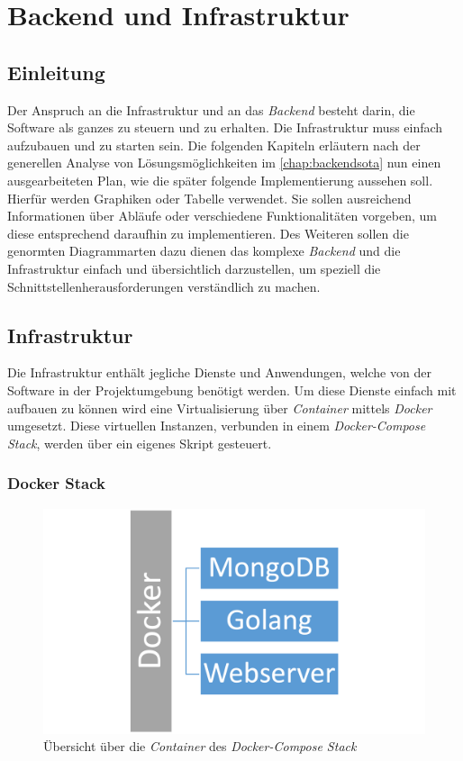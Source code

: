 
\section{Backend und Infrastruktur}
\label{chapter:conceptbi}
\subsection{Einleitung}
Der Anspruch an die Infrastruktur und an das \textit{Backend} besteht darin, die Software als ganzes zu steuern und zu erhalten. Die Infrastruktur muss einfach aufzubauen und zu starten sein. Die folgenden Kapiteln erläutern nach der generellen Analyse von Lösungsmöglichkeiten im \autoref{chap:backendsota} nun einen ausgearbeiteten Plan, wie die später folgende Implementierung aussehen soll. Hierfür werden Graphiken oder Tabelle verwendet. Sie sollen ausreichend Informationen über Abläufe oder verschiedene Funktionalitäten vorgeben, um diese entsprechend daraufhin zu implementieren. Des Weiteren sollen die genormten Diagrammarten dazu dienen das komplexe \textit{Backend} und die Infrastruktur einfach und übersichtlich darzustellen, um speziell die Schnittstellenherausforderungen verständlich zu machen.
\subsection{Infrastruktur}
Die Infrastruktur enthält jegliche Dienste und Anwendungen, welche von der Software in der Projektumgebung benötigt werden. Um diese Dienste einfach mit aufbauen zu können wird eine Virtualisierung über \textit{Container} mittels \textit{Docker} umgesetzt. Diese virtuellen Instanzen, verbunden in einem \textit{Docker-Compose Stack}, werden über ein eigenes Skript gesteuert.
\subsubsection{Docker Stack}
\begin{figure}[H]
	\centering
	\includegraphics[width=\linewidth]{images/mbeier_konzept/docker-stack}
	\caption[\textit{Docker-Compose Stack}]{Übersicht über die \textit{Container} des \textit{Docker-Compose Stack}}
	\label{fig:docker-stack}
\end{figure}

